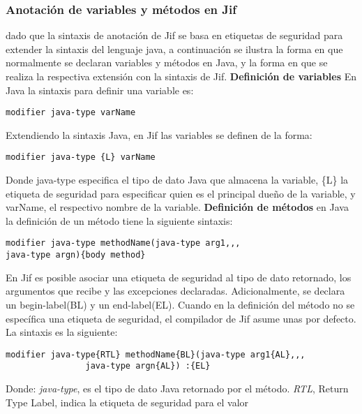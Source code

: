 \subsubsection{Anotación de variables y métodos en Jif}
\label{sssec:sintaxis}
dado que la sintaxis de anotación de Jif se basa en etiquetas de seguridad para
extender la sintaxis del lenguaje java, a continuación se ilustra la forma en
que normalmente se declaran variables y métodos en Java, y la forma en que se
realiza la respectiva extensión con la sintaxis de Jif.\newline
\textbf{Definición de variables}\newline
En Java la sintaxis para definir una variable es:
\begin{lstlisting}[basicstyle=\scriptsize]
	modifier java-type varName
\end{lstlisting}
Extendiendo la sintaxis Java, en Jif las variables se definen de la forma:
\begin{lstlisting}[basicstyle=\scriptsize]
	modifier java-type {L} varName
\end{lstlisting}
Donde java-type especifica el tipo de dato Java que almacena la variable, \{L\}
la etiqueta de seguridad  para especificar quien es el principal dueño de la
variable, y varName, el respectivo nombre de la variable.\newline
\textbf{Definición de métodos}\newline
en Java la definición de un método tiene la siguiente sintaxis:
\begin{lstlisting}[basicstyle=\scriptsize]
modifier java-type methodName(java-type arg1,,, 
java-type argn){body method}
\end{lstlisting}
En Jif  es posible asociar una etiqueta de seguridad al tipo de dato retornado,
los argumentos que recibe y las excepciones declaradas. 
Adicionalmente, se declara un begin-label(BL) y un end-label(EL).\newline
Cuando en la definición del método no se específica una etiqueta de seguridad,
el compilador de Jif asume unas por defecto. 
La sintaxis es la siguiente:
\begin{lstlisting}[basicstyle=\scriptsize]
modifier java-type{RTL} methodName{BL}(java-type arg1{AL},,,
				java-type argn{AL}) :{EL}
\end{lstlisting}
Donde: \emph{java-type}, es el tipo de dato Java retornado por el
método.\newline 
\emph{RTL}, Return Type Label, indica la etiqueta de seguridad para el valor
